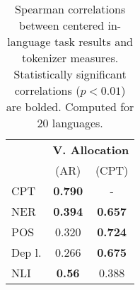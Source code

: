 \begin{table}
\centering

\begin{tabular}{lcc}
\toprule
 & \multicolumn{2}{c}{\bf{V. Allocation}} \\
 & (AR) &  (CPT) \\
\midrule
CPT    &    \bf{0.790} &     - \\
NER    &   \bf{0.394} &   \bf{0.657}  \\
POS    &     0.320 &   \bf{0.724} \\
Dep l. &     0.266 &   \bf{0.675} \\
NLI   &    \bf{0.56} &    0.388 \\ 
\bottomrule
\end{tabular}
\caption{Spearman correlations between centered in-language task results and tokenizer measures. Statistically significant correlations ($p<0.01$) are bolded. Computed for 20 languages.}
\label{tab:corr_in_lang_20l}
\end{table}